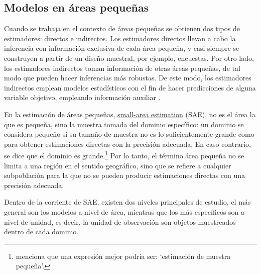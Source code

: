 \documentclass[11pt]{article}
\begin{document}
\subsection{Modelos en áreas pequeñas}
\label{subsec:areas-pequeñas}

Cuando se trabaja en el contexto de áreas pequeñas se obtienen dos tipos de estimadores: directos e indirectos. Los estimadores directos llevan a cabo la inferencia con información exclusiva de cada área pequeña, y casi siempre se construyen a partir de un diseño muestral, por ejemplo, encuestas. Por otro lado, los estimadores indirectos toman información de otras áreas pequeñas, de tal modo que pueden hacer inferencias más robustas. De este modo, los estimadores indirectos emplean modelos estadísticos con el fin de hacer predicciones de alguna variable objetivo, empleando información auxiliar \parencite{rao:2015}.

En la estimación de áreas pequeñas, \underline{small-area estimation} (SAE), no es el área la que es pequeña, sino la muestra tomada del dominio específico: un dominio se considera pequeño si su tamaño de muestra no es lo suficientemente grande como para obtener estimaciones directas con la precisión adecuada. En caso contrario, se dice que el dominio es grande.\footnote{\textcite{SAE} menciona que una expresión mejor podría ser: `estimación de muestra pequeña'.} Por lo tanto, el término área pequeña no se limita a una región en el sentido geográfico, sino que se refiere a cualquier subpoblación para la que no se pueden producir estimaciones directas con una precisión adecuada.


Dentro de la corriente de SAE, existen dos niveles principales de estudio, el más general son los modelos a nivel de área, mientras que los más específicos son a nivel de unidad, es decir, la unidad de observación son objetos muestreados dentro de cada dominio. 

\end{document}
